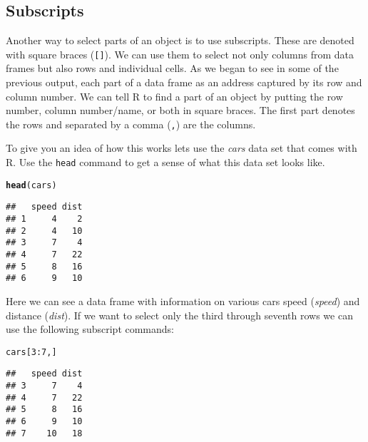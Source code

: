 \documentclass[ChapterTOCs,krantz1]{krantz}\usepackage{graphicx, color}
\makeatletter
\newcommand{\hlfunctioncall}[1]{\textcolor[rgb]{0.501960784313725,0,0.329411764705882}{\textbf{#1}}}%
\newenvironment{kframe}{%
 \def\at@end@of@kframe{}%
 \ifinner\ifhmode%
  \def\at@end@of@kframe{\end{minipage}}%
  \begin{minipage}{\columnwidth}%
 \fi\fi%
 \def\FrameCommand##1{\hskip\@totalleftmargin \hskip-\fboxsep
 \colorbox{shadecolor}{##1}\hskip-\fboxsep
     \hskip-\linewidth \hskip-\@totalleftmargin \hskip\columnwidth}%
 \MakeFramed {\advance\hsize-\width
   \@totalleftmargin\z@ \linewidth\hsize
   \@setminipage}}%
 {\par\unskip\endMakeFramed%
 \at@end@of@kframe}
\newenvironment{knitrout}{}{} %
\makeatother
\begin{document}
\subsection{Subscripts}

Another way to select parts of an object is to use subscripts. These are denoted with square braces (\texttt{[]}). We can use them to select not only columns from data frames but also rows and individual cells. As we began to see in some of the previous output, each part of a data frame as an address captured by its row and column number. We can tell R to find a part of an object by putting the row number, column number/name, or both in square braces. The first part denotes the rows and separated by a comma (\texttt{,}) are the columns. 

To give you an idea of how this works lets use the {\emph{cars}} data set that comes with R. Use the \texttt{head} command to get a sense of what this data set looks like.

\begin{knitrout}
\color{fgcolor}\begin{kframe}
\begin{alltt}
\hlfunctioncall{head}(cars)
\end{alltt}
\begin{verbatim}
##   speed dist
## 1     4    2
## 2     4   10
## 3     7    4
## 4     7   22
## 5     8   16
## 6     9   10
\end{verbatim}
\end{kframe}
\end{knitrout}


\noindent Here we can see a data frame with information on various cars speed ({\emph{speed}}) and distance ({\emph{dist}}). If we want to select only the third through seventh rows we can use the following subscript commands:

\begin{knitrout}
\color{fgcolor}\begin{kframe}
\begin{alltt}
cars[3:7, ]
\end{alltt}
\begin{verbatim}
##   speed dist
## 3     7    4
## 4     7   22
## 5     8   16
## 6     9   10
## 7    10   18
\end{verbatim}
\end{kframe}
\end{knitrout}
\end{document}
